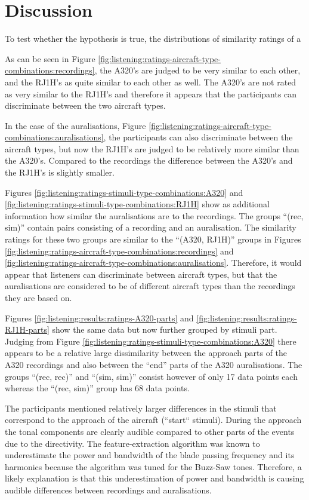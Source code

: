 \newpage
\section{Discussion}
To test whether the hypothesis is true, the distributions of similarity ratings of a

As can be seen in Figure
\ref{fig:listening:ratings-aircraft-type-combinations:recordings}, the A320's
are judged to be very similar to each other, and the RJ1H's as quite similar to
each other as well. The A320's are not rated as very similar to the RJ1H's and therefore
it appears that the participants can discriminate between the two aircraft
types.

In the case of the auralisations, Figure
\ref{fig:listening:ratings-aircraft-type-combinations:auralisations}, the
participants can also discriminate between the aircraft types, but now the
RJ1H's are judged to be relatively more similar than the A320's. Compared to the
recordings the difference between the A320's and the RJ1H's is slightly smaller.


Figures \ref{fig:listening:ratings-stimuli-type-combinations:A320} and
\ref{fig:listening:ratings-stimuli-type-combinations:RJ1H} show as additional
information how similar the auralisations are to the recordings. The groups
``(rec, sim)'' contain pairs consisting of a recording and an auralisation. The
similarity ratings for these two groups are similar to the ``(A320, RJ1H)''
groups in Figures
\ref{fig:listening:ratings-aircraft-type-combinations:recordings} and
\ref{fig:listening:ratings-aircraft-type-combinations:auralisations}. Therefore,
it would appear that listeners can discriminate between aircraft types, but that
the auralisations are considered to be of different aircraft types than the
recordings they are based on.

Figures \ref{fig:listening:results:ratings-A320-parts} and
\ref{fig:listening:results:ratings-RJ1H-parts} show the same data
but now further grouped by stimuli part. Judging from Figure
\ref{fig:listening:ratings-stimuli-type-combinations:A320} there appears to be a
relative large dissimilarity between the approach parts of the A320 recordings
and also between the ``end'' parts of the A320 auralisations. The groups ``(rec,
rec)'' and ``(sim, sim)'' consist however of only 17 data points each whereas
the ``(rec, sim)'' group has 68 data points.

The participants mentioned relatively larger differences in the stimuli that
correspond to the approach of the aircraft (``start`` stimuli). During the
approach the tonal components are clearly audible compared to other parts of the
events due to the directivity. The feature-extraction algorithm was known to
underestimate the power and bandwidth of the blade passing frequency and its
harmonics because the algorithm was tuned for the Buzz-Saw tones. Therefore, a
likely explanation is that this underestimation of power and bandwidth is
causing audible differences between recordings and auralisations.
